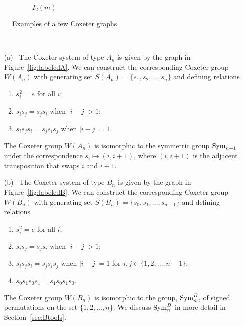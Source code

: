 \begin{figure}[h]
\begin{subfigure}{1.0\textwidth} \centering
{}
\caption{$I_{2}(m)$} \label{fig:labeledI}
\end{subfigure}

\caption{Examples of a few Coxeter graphs.}\label{fig:labeledgraphs}
\end{figure}


\begin{example}
~
\begin{itemize}
\item[(a)~] The Coxeter system of type $A_n$ is given by the graph in Figure~\ref{fig:labeledA}. We can construct the corresponding Coxeter group $W(A_n)$ with generating set $S(A_n)=\{s_1, s_2, \ldots ,s_n\}$ and defining relations
\begin{enumerate}[leftmargin=2cm]
	\item $s_i^2=e$ for all $i$;
	\item $s_is_j=s_js_i$ when $|i-j|>1$;
	\item $s_is_js_i=s_js_is_j$ when $|i-j|=1.$
\end{enumerate}
The Coxeter group $W(A_n)$ is isomorphic to the symmetric group $\mathrm{Sym}_{n+1}$ under the correspondence $s_i \mapsto (i, i+1)$, where $(i, i+1)$ is the adjacent transposition that swaps $i$ and $i+1$.
\item[(b)~]\label{ex:B} The Coxeter system of type $B_n$ is given by the graph in Figure~\ref{fig:labeledB}. We can construct the corresponding Coxeter group $W(B_n)$ with generating set $S(B_n)=\{s_0,s_1, \ldots ,s_{n-1}\}$ and defining relations
\begin{enumerate}[leftmargin=2cm]
	\item $s_i^2=e$ for all $i$;
	\item $s_is_j=s_js_i$  when $|i-j|>1$;
	\item $s_is_js_i=s_js_is_j$ when $|i-j|=1$ for $i,j \in \{1,2,\ldots, n-1\}$;
	\item $s_0s_1s_0s_1=s_1s_0s_1s_0$.
\end{enumerate}
The Coxeter group $W(B_n)$ is isomorphic to the group, $\mathrm{Sym}_n^B$, of signed permutations on the set $\{1,2, \ldots,n\}$. We discuss $\mathrm{Sym}_n^B$ in more detail in Section~\ref{sec:Btools}.

\end{itemize}
\end{example}
